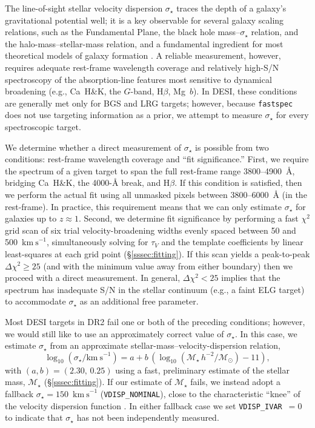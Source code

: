 \documentclass[modern,linenumbers]{aastex702}
\newcommand{\fastspec}{\texttt{fastspec}}
\newcommand{\kms}{\ensuremath{\mathrm{km~s}^{-1}}}
\newcommand{\vdisp}{\ensuremath{\sigma_\star}}
\newcommand{\tauv}{\ensuremath{\tau_V}}
\newcommand{\Mstar}{\ensuremath{\mathcal{M}_{\star}}}
\newcommand{\msun}{\ensuremath{\mathcal{M}_{\odot}}}
\newcommand{\logmstar}{\ensuremath{\log_{10}(\Mstar\,h^{-2}/\msun)}}
\begin{document}
The line-of-sight stellar velocity dispersion \vdisp{} traces the
depth of a galaxy's gravitational potential well; it is a key
observable for several galaxy scaling relations, such as the
Fundamental Plane, the black hole mass--\vdisp{} relation, and the
halo-mass--stellar-mass relation, and a fundamental ingredient for
most theoretical models of galaxy formation \citep[and references
  therein]{renzini06a, blanton09a, kormendy13a, vegetti24a}. A
reliable measurement, however, requires adequate rest-frame wavelength
coverage and relatively high-S/N spectroscopy of the absorption-line
features most sensitive to dynamical broadening (e.g., Ca~H\&K, the
$G$-band, H$\beta$, Mg~$b$). In DESI, these conditions are generally
met only for BGS and LRG targets; however, because \fastspec{} does
not use targeting information as a prior, we attempt to measure
\vdisp{} for every spectroscopic target.

We determine whether a direct measurement of \vdisp{} is possible from
two conditions: rest-frame wavelength coverage and ``fit
significance.'' First, we require the spectrum of a given target to
span the full rest-frame range 3800--4900~\AA, bridging Ca~H\&K, the
4000-\AA{} break, and H$\beta$. If this condition is satisfied, then
we perform the actual fit using all unmasked pixels between
3800--6000~\AA{} (in the rest-frame). In practice, this requirement
means that we can only estimate \vdisp{} for galaxies up to
$z\approx1$. Second, we determine fit significance by performing a
fast $\chi^2$ grid scan of six trial velocity-broadening widths evenly
spaced between 50 and 500~\kms, simultaneously solving for \tauv{} and
the template coefficients by linear least-squares at each grid point
(\S\ref{sssec:fitting}). If this scan yields a peak-to-peak
$\Delta\chi^2 \geq 25$ (and with the minimum value away from either
boundary) then we proceed with a direct measurement. In general,
$\Delta\chi^2 < 25$ implies that the spectrum has inadequate S/N in
the stellar continuum (e.g., a faint ELG target) to accommodate
\vdisp{} as an additional free parameter.

Most DESI targets in DR2 fail one or both of the preceding conditions;
however, we would still like to use an approximately correct value of
\vdisp. In this case, we estimate \vdisp{} from an approximate
stellar-mass--velocity-dispersion relation,
\begin{equation}
  \log_{10}(\vdisp/\kms) = a + b\,(\logmstar - 11),
  \label{eq:sigma_mstar}
\end{equation}
with $(a,b) = (2.30,\,0.25)$ using a fast, preliminary estimate of the
stellar mass, \Mstar{} (\S\ref{sssec:fitting}). If our estimate of
\Mstar{} fails, we instead adopt a fallback
$\vdisp = 150$~\kms{} (\texttt{VDISP\_NOMINAL}), close to the
characteristic ``knee'' of the velocity dispersion function
\citep{bezanson11a, taylor22a}. In either fallback case we set
\texttt{VDISP\_IVAR}~$=0$ to indicate that \vdisp{} has not been
independently measured.
\end{document}
